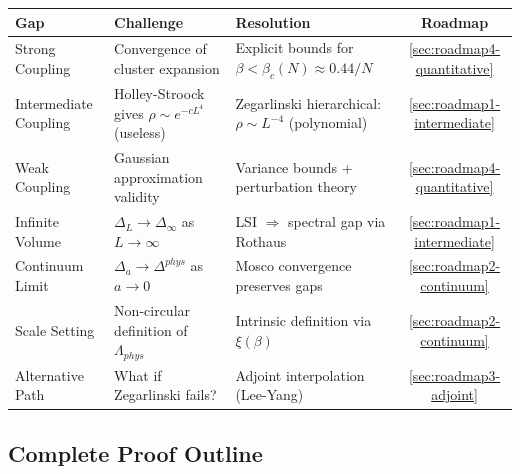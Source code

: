 \begin{center}
\renewcommand{\arraystretch}{1.5}
\begin{tabular}{|p{3cm}|p{4cm}|p{4cm}|c|}
\hline
\textbf{Gap} & \textbf{Challenge} & \textbf{Resolution} & \textbf{Roadmap} \\
\hline
Strong Coupling & 
Convergence of cluster expansion & 
Explicit bounds for $\beta < \beta_c(N) \approx 0.44/N$ & 
\ref{sec:roadmap4-quantitative} \\
\hline
Intermediate Coupling &
Holley-Stroock gives $\rho \sim e^{-cL^4}$ (useless) &
Zegarlinski hierarchical: $\rho \sim L^{-4}$ (polynomial) &
\ref{sec:roadmap1-intermediate} \\
\hline
Weak Coupling &
Gaussian approximation validity &
Variance bounds + perturbation theory &
\ref{sec:roadmap4-quantitative} \\
\hline
Infinite Volume &
$\Delta_L \to \Delta_\infty$ as $L \to \infty$ &
LSI $\Rightarrow$ spectral gap via Rothaus &
\ref{sec:roadmap1-intermediate} \\
\hline
Continuum Limit &
$\Delta_a \to \Delta^{phys}$ as $a \to 0$ &
Mosco convergence preserves gaps &
\ref{sec:roadmap2-continuum} \\
\hline
Scale Setting &
Non-circular definition of $\Lambda_{phys}$ &
Intrinsic definition via $\xi(\beta)$ &
\ref{sec:roadmap2-continuum} \\
\hline
Alternative Path &
What if Zegarlinski fails? &
Adjoint interpolation (Lee-Yang) &
\ref{sec:roadmap3-adjoint} \\
\hline
\end{tabular}
\end{center}

\subsection{Complete Proof Outline}
\label{subsec:complete-proof}

